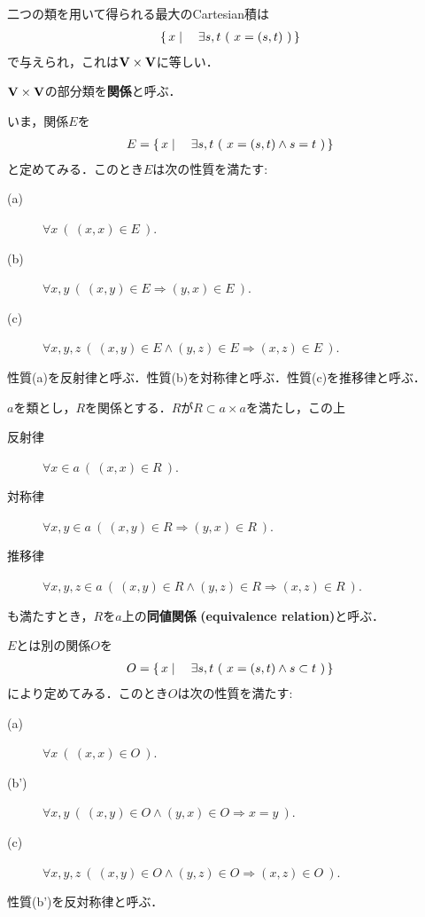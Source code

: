 	二つの類を用いて得られる最大のCartesian積は
	\begin{align}
		\left\{\, x \mid \quad \exists s,t\ (\ x=(s,t)\ )\, \right\}
	\end{align}
	で与えられ，これは$\mathbf{V} \times \mathbf{V}$に等しい．
	
	\begin{screen}
		\begin{dfn}[関係]
			$\mathbf{V} \times \mathbf{V}$の部分類を{\bf 関係}と呼ぶ．
		\end{dfn}
	\end{screen}
	
	いま，関係$E$を
	\begin{align}
		E = \left\{\, x \mid \quad \exists s,t\ (\ x=(s,t) \wedge s = t\ )\, \right\}
	\end{align}
	と定めてみる．このとき$E$は次の性質を満たす:
	\begin{description}
		\item[(a)] $\forall x\ (\ (x,x) \in E\ )$.
		\item[(b)] $\forall x,y\ (\ (x,y) \in E \Longrightarrow (y,x) \in E\ )$.
		\item[(c)] $\forall x,y,z\ (\ (x,y) \in E \wedge (y,z) \in E \Longrightarrow (x,z) \in E\ )$.
	\end{description}
	性質(a)を反射律と呼ぶ．性質(b)を対称律と呼ぶ．性質(c)を推移律と呼ぶ．
	
	\begin{screen}
		\begin{dfn}[同値関係]
			$a$を類とし，$R$を関係とする．$R$が$R \subset a \times a$を満たし，この上
			\begin{description}
				\item[反射律] $\forall x \in a\ (\ (x,x) \in R\ )$.
				\item[対称律] $\forall x,y \in a\ (\ (x,y) \in R \Longrightarrow (y,x) \in R\ )$.
				\item[推移律] $\forall x,y,z \in a\ (\ (x,y) \in R \wedge (y,z) \in R \Longrightarrow (x,z) \in R\ )$.
			\end{description}
			も満たすとき，$R$を$a$上の{\bf 同値関係}\index{どうちかんけい@同値関係}
			{\bf (equivalence relation)}と呼ぶ．
		\end{dfn}
	\end{screen}
	
	
	$E$とは別の関係$O$を
	\begin{align}
		O = \left\{\, x \mid \quad \exists s,t\ (\ x=(s,t) \wedge s \subset t\ )\, \right\}
	\end{align}
	により定めてみる．このとき$O$は次の性質を満たす:
	\begin{description}
		\item[(a)] $\forall x\ (\ (x,x) \in O\ )$.
		\item[(b')] $\forall x,y\ (\ (x,y) \in O \wedge (y,x) \in O \Longrightarrow x=y\ )$.
		\item[(c)] $\forall x,y,z\ (\ (x,y) \in O \wedge (y,z) \in O \Longrightarrow (x,z) \in O\ )$.
	\end{description}
	性質(b')を反対称律と呼ぶ．
	
